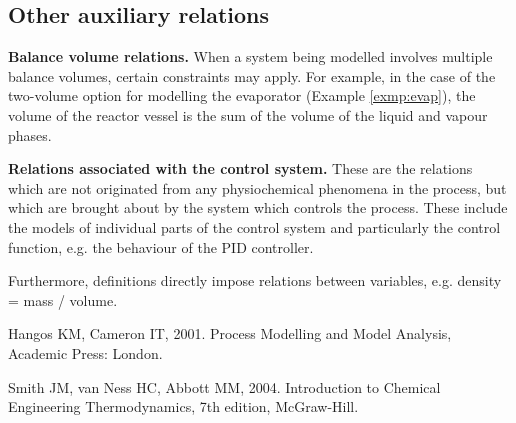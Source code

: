 \documentclass[a4paper,11pt]{article}
\theoremstyle{definition}
\begin{document}
\subsection{Other auxiliary relations}

\textbf{Balance volume relations.} When a system being modelled involves multiple balance volumes, certain constraints may apply.
For example, in the case of the two-volume option for modelling the evaporator (Example \ref{exmp:evap}),
the volume of the reactor vessel is the sum of the volume of the liquid and vapour phases.

\textbf{Relations associated with the control system.}
These are the relations which are not originated from any physiochemical phenomena in the process, 
but which are brought about by the system which controls the process.
These include the models of individual parts of the control system and particularly the control function, 
e.g. the behaviour of the PID controller.

Furthermore, definitions directly impose relations between variables, e.g. density = mass / volume.



\begin{thebibliography}{2}
\vspace{-0.4cm}
	Hangos KM, Cameron IT, 2001. Process Modelling and Model Analysis, Academic Press: London.

	Smith JM, van Ness HC, Abbott MM, 2004. Introduction to Chemical Engineering Thermodynamics, 7th edition, McGraw-Hill.
\end{thebibliography}
\end{document}
